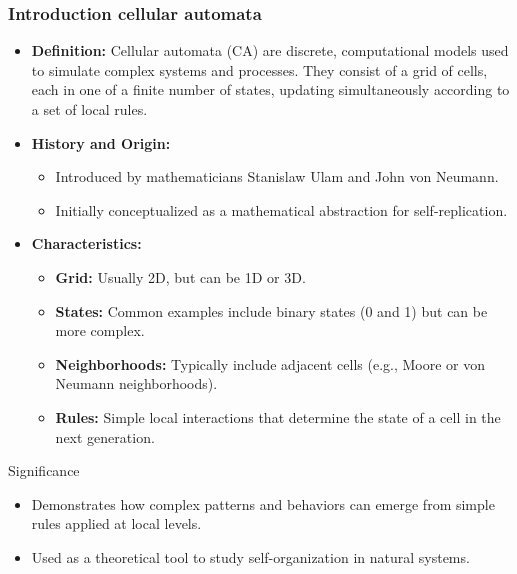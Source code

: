\begin{frame}
\frametitle{Introduction cellular automata}
     \small
\begin{itemize}
    \item \textbf{Definition:} Cellular automata (CA) are discrete, computational models used to simulate complex systems and processes. They consist of a grid of cells, each in one of a finite number of states, updating simultaneously according to a set of local rules.
    \item \textbf{History and Origin:}
    \begin{itemize}
        \item Introduced by mathematicians Stanislaw Ulam and John von Neumann.
        \item Initially conceptualized as a mathematical abstraction for self-replication.
    \end{itemize}
    \item \textbf{Characteristics:}
    \begin{itemize}
    \scriptsize
        \item \textbf{Grid:} Usually 2D, but can be 1D or 3D.
        \item \textbf{States:} Common examples include binary states (0 and 1) but can be more complex.
        \item \textbf{Neighborhoods:} Typically include adjacent cells (e.g., Moore or von Neumann neighborhoods).
        \item \textbf{Rules:} Simple local interactions that determine the state of a cell in the next generation.
    \end{itemize}
   
\end{itemize}
\end{frame}


\begin{frame}{Significance}
    \begin{itemize}
        \item Demonstrates how complex patterns and behaviors can emerge from simple rules applied at local levels.
        \item Used as a theoretical tool to study self-organization in natural systems.
    \end{itemize}
    
\end{frame}

